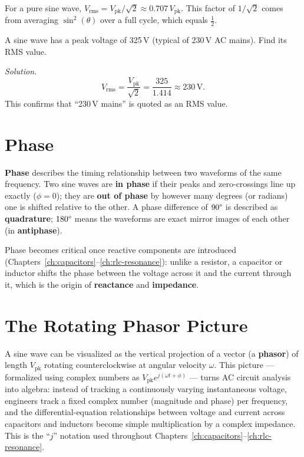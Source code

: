 For a pure sine wave, $V_{\text{rms}} = V_{\text{pk}}/\sqrt{2} \approx
0.707\,V_{\text{pk}}$. This factor of $1/\sqrt2$ comes from averaging
$\sin^2(\theta)$ over a full cycle, which equals $\tfrac12$.

\begin{examplebox}
A sine wave has a peak voltage of 325\,V (typical of 230\,V AC mains).
Find its RMS value.

\emph{Solution.}
\[
V_{\text{rms}} = \frac{V_{\text{pk}}}{\sqrt2} = \frac{325}{1.414} \approx 230\,\text{V}.
\]
This confirms that ``230\,V mains'' is quoted as an RMS value.
\end{examplebox}

\section{Phase}

\textbf{Phase} describes the timing relationship between two waveforms of
the same frequency. Two sine waves are \textbf{in phase} if their peaks
and zero-crossings line up exactly ($\phi = 0$); they are \textbf{out of
phase} by however many degrees (or radians) one is shifted relative to
the other. A phase difference of $90\degree$ is described as
\textbf{quadrature}; $180\degree$ means the waveforms are exact mirror
images of each other (in \textbf{antiphase}).

Phase becomes critical once reactive components are introduced
(Chapters~\ref{ch:capacitors}--\ref{ch:rlc-resonance}): unlike a
resistor, a capacitor or inductor shifts the phase between the voltage
across it and the current through it, which is the origin of
\textbf{reactance} and \textbf{impedance}.

\section{The Rotating Phasor Picture}

A sine wave can be visualized as the vertical projection of a vector (a
\textbf{phasor}) of length $V_{\text{pk}}$ rotating counterclockwise at
angular velocity $\omega$. This picture --- formalized using complex
numbers as $V_{\text{pk}}e^{j(\omega t + \phi)}$ --- turns AC circuit
analysis into algebra: instead of tracking a continuously varying
instantaneous voltage, engineers track a fixed complex number (magnitude
and phase) per frequency, and the differential-equation relationships
between voltage and current across capacitors and inductors become
simple multiplication by a complex impedance. This is the ``$j$''
notation used throughout Chapters~\ref{ch:capacitors}--\ref{ch:rlc-resonance}.

